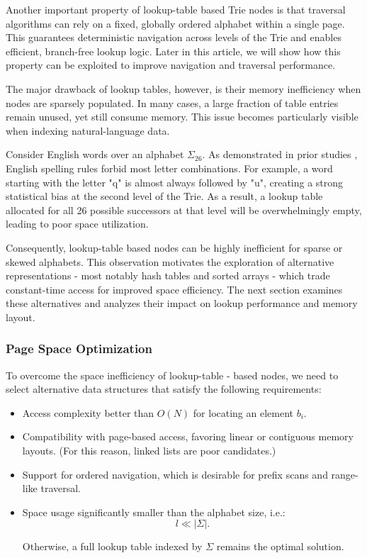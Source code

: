 \documentclass[pdflatex,sn-mathphys-num]{sn-jnl}%
\theoremstyle{thmstyleone}%
\theoremstyle{thmstyletwo}%
\theoremstyle{thmstylethree}%
\begin{document}
Another important property of lookup-table based Trie nodes is that
traversal algorithms can rely on a fixed, globally ordered alphabet
within a single page. This guarantees deterministic navigation across
levels of the Trie and enables efficient, branch-free lookup logic.
Later in this article, we will show how this property can be exploited
to improve navigation and traversal performance.

The major drawback of lookup tables, however, is their memory
inefficiency when nodes are sparsely populated. In many cases, a large
fraction of table entries remain unused, yet still consume memory. This
issue becomes particularly visible when indexing natural-language data.

Consider English words over an alphabet \(\Sigma_{26}\). As demonstrated
in prior studies \cite{yau2014distribution, norvig2012english} , English spelling rules forbid most letter
combinations. For example, a word starting with the letter "q" is almost
always followed by "u", creating a strong statistical bias at the second
level of the Trie. As a result, a lookup table allocated for all 26
possible successors at that level will be overwhelmingly empty, leading
to poor space utilization.

Consequently, lookup-table based nodes can be highly inefficient for
sparse or skewed alphabets. This observation motivates the exploration
of alternative representations - most notably hash tables and sorted
arrays - which trade constant-time access for improved space efficiency.
The next section examines these alternatives and analyzes their impact
on lookup performance and memory layout.

\subsubsection{Page Space Optimization}\label{page-space-optimization}

To overcome the space inefficiency of lookup-table - based nodes, we
need to select alternative data structures that satisfy the following
requirements:

\begin{itemize}
\item
  Access complexity better than \(O(N)\) for locating an element
  \(b_{i}\).
\item
  Compatibility with page-based access, favoring linear or contiguous
  memory layouts. (For this reason, linked lists are poor candidates.)
\item
  Support for ordered navigation, which is desirable for prefix scans
  and range-like traversal.
\item
  Space usage significantly smaller than the alphabet size, i.e.:
\begin{equation}
l \ll |\Sigma|.\label{eq:lessThanAlphabet}
\end{equation}

Otherwise, a full lookup table indexed by \(\Sigma\) remains the optimal solution.

\end{itemize}
\end{document}
